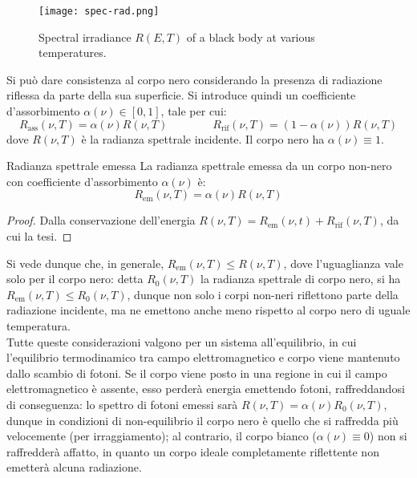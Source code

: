 \begin{figure}
	\centering
	\texttt{[image: spec-rad.png]}
	\caption{Spectral irradiance $ R(E,T) $ of a black body at various temperatures.}
	\label{spec-rad}
\end{figure}

Si può dare consistenza al corpo nero considerando la presenza di radiazione riflessa da parte della sua superficie. Si introduce quindi un coefficiente d'assorbimento $ \alpha(\nu) \in [0,1] $, tale per cui:
\begin{equation}
	R_\text{ass}(\nu,T) = \alpha(\nu) R(\nu,T)
	\qquad \qquad
	R_\text{rif}(\nu,T) = (1 - \alpha(\nu)) R(\nu,T)
\end{equation}
dove $ R(\nu,T) $ è la radianza spettrale incidente. Il corpo nero ha $ \alpha(\nu) \equiv 1 $.

\begin{proposition}{Radianza spettrale emessa}{}
	La radianza spettrale emessa da un corpo non-nero con coefficiente d'assorbimento $ \alpha(\nu) $ è:
	\begin{equation}
		R_\text{em}(\nu,T) = \alpha(\nu) R(\nu,T)
	\end{equation}

	\tcblower

	\begin{proof}
		Dalla conservazione dell'energia $ R(\nu,T) = R_\text{em}(\nu,t) + R_\text{rif}(\nu,T) $, da cui la tesi.
	\end{proof}
\end{proposition}

Si vede dunque che, in generale, $ R_\text{em}(\nu,T) \le R(\nu,T) $, dove l'uguaglianza vale solo per il corpo nero: detta $ R_0(\nu,T) $ la radianza spettrale di corpo nero, si ha $ R_\text{em}(\nu,T) \le R_0(\nu,T) $, dunque non solo i corpi non-neri riflettono parte della radiazione incidente, ma ne emettono anche meno rispetto al corpo nero di uguale temperatura. \\
Tutte queste considerazioni valgono per un sistema all'equilibrio, in cui l'equilibrio termodinamico tra campo elettromagnetico e corpo viene mantenuto dallo scambio di fotoni. Se il corpo viene posto in una regione in cui il campo elettromagnetico è assente, esso perderà energia emettendo fotoni, raffreddandosi di conseguenza: lo spettro di fotoni emessi sarà $ R(\nu,T) = \alpha(\nu) R_0(\nu,T) $, dunque in condizioni di non-equilibrio il corpo nero è quello che si raffredda più velocemente (per irraggiamento); al contrario, il corpo bianco ($ \alpha(\nu) \equiv 0 $) non si raffredderà affatto, in quanto un corpo ideale completamente riflettente non emetterà alcuna radiazione.

